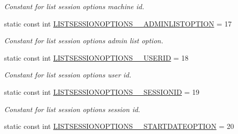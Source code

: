 \begin{DoxyCompactItemize}
\begin{DoxyCompactList}\small\item\em Constant for list session options machine id. \item\end{DoxyCompactList}\item 
\hypertarget{classUMS__Data_1_1UMS__DataPackage_abf413a4095add5a6ac71cac1c20c5136}{
static const int \hyperlink{classUMS__Data_1_1UMS__DataPackage_abf413a4095add5a6ac71cac1c20c5136}{LISTSESSIONOPTIONS\_\-\_\-ADMINLISTOPTION} = 17}
\label{classUMS__Data_1_1UMS__DataPackage_abf413a4095add5a6ac71cac1c20c5136}

\begin{DoxyCompactList}\small\item\em Constant for list session options admin list option. \item\end{DoxyCompactList}\item 
\hypertarget{classUMS__Data_1_1UMS__DataPackage_a4f4dfd18f348603c71b123997329c860}{
static const int \hyperlink{classUMS__Data_1_1UMS__DataPackage_a4f4dfd18f348603c71b123997329c860}{LISTSESSIONOPTIONS\_\-\_\-USERID} = 18}
\label{classUMS__Data_1_1UMS__DataPackage_a4f4dfd18f348603c71b123997329c860}

\begin{DoxyCompactList}\small\item\em Constant for list session options user id. \item\end{DoxyCompactList}\item 
\hypertarget{classUMS__Data_1_1UMS__DataPackage_adde877aa4faecae3e2318359af6a8f2b}{
static const int \hyperlink{classUMS__Data_1_1UMS__DataPackage_adde877aa4faecae3e2318359af6a8f2b}{LISTSESSIONOPTIONS\_\-\_\-SESSIONID} = 19}
\label{classUMS__Data_1_1UMS__DataPackage_adde877aa4faecae3e2318359af6a8f2b}

\begin{DoxyCompactList}\small\item\em Constant for list session options session id. \item\end{DoxyCompactList}\item 
\hypertarget{classUMS__Data_1_1UMS__DataPackage_a9cb897d6255f0eae3ac3025d6f0b3db3}{
static const int \hyperlink{classUMS__Data_1_1UMS__DataPackage_a9cb897d6255f0eae3ac3025d6f0b3db3}{LISTSESSIONOPTIONS\_\-\_\-STARTDATEOPTION} = 20}
\label{classUMS__Data_1_1UMS__DataPackage_a9cb897d6255f0eae3ac3025d6f0b3db3}


\end{DoxyCompactItemize}
